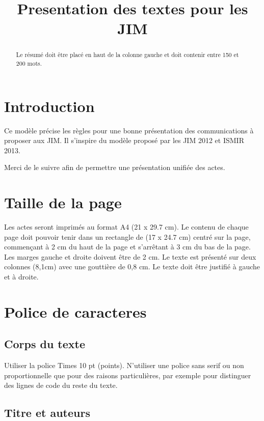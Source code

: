 \documentclass{article}
\title{Presentation des textes pour les JIM}
\begin{document}
%
\maketitle
%
\begin{abstract}
Le résumé doit être placé en haut de la colonne gauche et doit contenir entre 150 et 200 mots.
\end{abstract}
%
\section{Introduction}\label{sec:introduction}

Ce modèle précise les règles pour une bonne présentation des communications à proposer aux JIM. Il s'inspire du modèle proposé par les JIM 2012 et ISMIR 2013.

Merci de le suivre afin de permettre une présentation unifiée des actes. 


\section{Taille de la page}\label{sec:page_size}

Les actes seront imprimés au format A4 (21 x 29.7 cm). Le contenu de chaque page doit pouvoir tenir dans un rectangle de (17 x 24.7 cm) centré sur la page, commençant à 2 cm du haut de la page et s'arrêtant à  3 cm du bas de la page. Les marges gauche et droite doivent être de 2 cm. Le texte est présenté sur deux colonnes (8,1cm) avec une gouttière  de 0,8 cm. Le texte doit être justifié à gauche et à droite.

\section{Police de caracteres}\label{sec:typeset_text}

\subsection{Corps du texte}\label{subsec:body}

Utiliser la police Times 10 pt (points). N'utiliser une police sans serif ou non proportionnelle que pour des raisons particulières, par exemple pour distinguer des lignes de code du reste du texte.

\subsection{Titre et auteurs}
\end{document}
